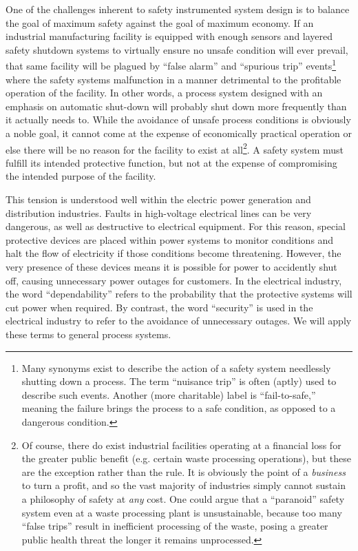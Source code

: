 One of the challenges inherent to safety instrumented system design is to balance the goal of maximum safety against the goal of maximum economy.  If an industrial manufacturing facility is equipped with enough sensors and layered safety shutdown systems to virtually ensure no unsafe condition will ever prevail, that same facility will be plagued by ``false alarm'' and ``spurious trip'' events\footnote{Many synonyms exist to describe the action of a safety system needlessly shutting down a process.  The term ``nuisance trip'' is often (aptly) used to describe such events.  Another (more charitable) label is ``fail-to-safe,'' meaning the failure brings the process to a safe condition, as opposed to a dangerous condition.} where the safety systems malfunction in a manner detrimental to the profitable operation of the facility.  In other words, a process system designed with an emphasis on automatic shut-down will probably shut down more frequently than it actually needs to.  While the avoidance of unsafe process conditions is obviously a noble goal, it cannot come at the expense of economically practical operation or else there will be no reason for the facility to exist at all\footnote{Of course, there do exist industrial facilities operating at a financial loss for the greater public benefit (e.g. certain waste processing operations), but these are the exception rather than the rule.  It is obviously the point of a \textit{business} to turn a profit, and so the vast majority of industries simply cannot sustain a philosophy of safety at \textit{any} cost.  One could argue that a ``paranoid'' safety system even at a waste processing plant is unsustainable, because too many ``false trips'' result in inefficient processing of the waste, posing a greater public health threat the longer it remains unprocessed.}.  A safety system must fulfill its intended protective function, but not at the expense of compromising the intended purpose of the facility.  

This tension is understood well within the electric power generation and distribution industries.  Faults in high-voltage electrical lines can be very dangerous, as well as destructive to electrical equipment.  For this reason, special protective devices are placed within power systems to monitor conditions and halt the flow of electricity if those conditions become threatening.  However, the very presence of these devices means it is possible for power to accidently shut off, causing unnecessary power outages for customers.  In the electrical industry, the word ``dependability'' refers to the probability that the protective systems will cut power when required.  By contrast, the word ``security'' is used in the electrical industry to refer to the avoidance of unnecessary outages.  We will apply these terms to general process systems.       

